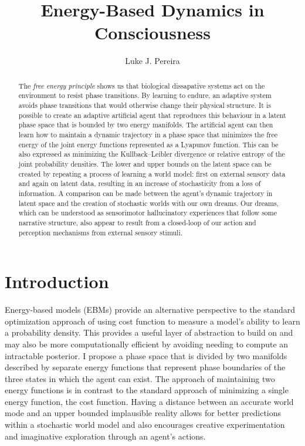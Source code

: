 \documentclass{article}
\title{Energy-Based Dynamics in Consciousness}
\author{%
  Luke J. Pereira \\
}
\begin{document}
\maketitle
\vspace{-0.5cm}

\begin{abstract}
The \textit{free energy principle} shows us that biological dissapative systems act on the environment to resist phase transitions. By learning to endure, an adaptive system avoids phase transitions that would otherwise change their physical structure. It is possible to create an adaptive artificial agent that reproduces this behaviour in a latent phase space that is bounded by two energy manifolds. The artificial agent can then learn how to maintain a dynamic trajectory in a phase space that minimizes the free energy of the joint energy functions represented as a Lyapunov function. This can be also expressed as minimizing the Kullback–Leibler divergence or relative entropy of the joint probability densities. The lower and upper bounds on the latent space can be created by repeating a process of learning a world model: first on external sensory data and again on latent data, resulting in an increase of stochasticity from a loss of information. A comparison can be made between the agent's dynamic trajectory in latent space and the creation of stochastic worlds with our own dreams. Our dreams, which can be understood as sensorimotor hallucinatory experiences that follow some narrative structure, also appear to result from a closed-loop of our action and perception mechanisms from external sensory stimuli.
\end{abstract}

\begin{center}
    
\end{center}

\newpage

\section{Introduction}

Energy-based models (EBMs) provide an alternative perspective to the standard optimization approach of using cost function to measure a model's ability to learn a probability density. This provides a useful layer of abstraction to build on and may also be more computationally efficient by avoiding needing to compute an intractable posterior. I propose a phase space that is divided by two manifolds described by separate energy functions that represent phase boundaries of the three states in which the agent can exist. The approach of maintaining two energy functions is in contrast to the standard approach of minimizing a single energy function, the cost function. Having a distance between an accurate world mode and an upper bounded implausible reality allows for better predictions within a stochastic world model and also encourages creative experimentation and imaginative exploration through an agent's actions. 
\end{document}
